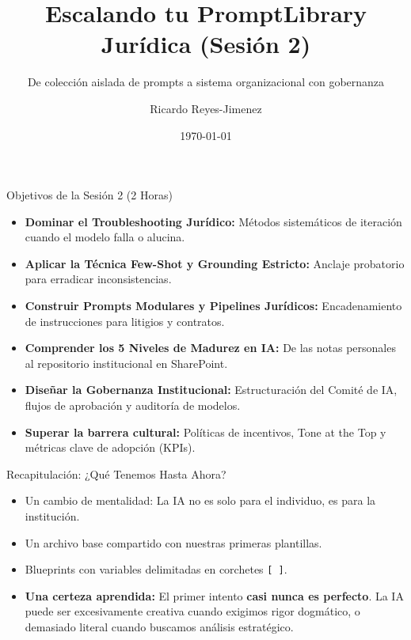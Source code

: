 \documentclass[aspectratio=169]{beamer}
\title[ Escalando tu PromptLibrary Ju]{ Escalando tu PromptLibrary Jurídica (Sesión 2)}
\subtitle{ De colección aislada de prompts a sistema organizacional con gobernanza}
\author{Ricardo Reyes-Jimenez}
\institute{Universidad de La Sabana}
\date{\today}
\begin{document}
\begin{frame}
  \titlepage
\end{frame}

\usebackgroundtemplate{}


\begin{frame}{Objetivos de la Sesión 2 (2 Horas)}

\begin{itemize}
  \item \textbf{Dominar el Troubleshooting Jurídico:} Métodos sistemáticos de iteración cuando el modelo falla o alucina.
  \item \textbf{Aplicar la Técnica Few-Shot y Grounding Estricto:} Anclaje probatorio para erradicar inconsistencias.
  \item \textbf{Construir Prompts Modulares y Pipelines Jurídicos:} Encadenamiento de instrucciones para litigios y contratos.
  \item \textbf{Comprender los 5 Niveles de Madurez en IA:} De las notas personales al repositorio institucional en SharePoint.
  \item \textbf{Diseñar la Gobernanza Institucional:} Estructuración del Comité de IA, flujos de aprobación y auditoría de modelos.
  \item \textbf{Superar la barrera cultural:} Políticas de incentivos, Tone at the Top y métricas clave de adopción (KPIs).
\end{itemize}
\end{frame}

\begin{frame}{Recapitulación: ¿Qué Tenemos Hasta Ahora?}

\begin{itemize}
  \item Un cambio de mentalidad: La IA no es solo para el individuo, es para la institución.
  \item Un archivo base compartido con nuestras primeras plantillas.
  \item Blueprints con variables delimitadas en corchetes \texttt{[ ]}.
  \item \textbf{Una certeza aprendida:} El primer intento \textbf{casi nunca es perfecto}. La IA puede ser excesivamente creativa cuando exigimos rigor dogmático, o demasiado literal cuando buscamos análisis estratégico.
\end{itemize}
\end{frame}
\end{document}
